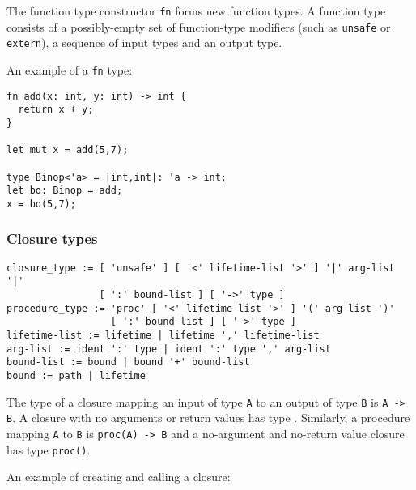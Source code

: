 \documentclass[]{article}
\begin{document}

The function type constructor \texttt{fn} forms new function types. A
function type consists of a possibly-empty set of function-type
modifiers (such as \texttt{unsafe} or \texttt{extern}), a sequence of
input types and an output type.

An example of a \texttt{fn} type:

\begin{verbatim}
fn add(x: int, y: int) -> int {
  return x + y;
}

let mut x = add(5,7);

type Binop<'a> = |int,int|: 'a -> int;
let bo: Binop = add;
x = bo(5,7);
\end{verbatim}

\subsubsection{Closure types}\label{closure-types}

\begin{verbatim}
closure_type := [ 'unsafe' ] [ '<' lifetime-list '>' ] '|' arg-list '|'
                [ ':' bound-list ] [ '->' type ]
procedure_type := 'proc' [ '<' lifetime-list '>' ] '(' arg-list ')'
                  [ ':' bound-list ] [ '->' type ]
lifetime-list := lifetime | lifetime ',' lifetime-list
arg-list := ident ':' type | ident ':' type ',' arg-list
bound-list := bound | bound '+' bound-list
bound := path | lifetime
\end{verbatim}

The type of a closure mapping an input of type \texttt{A} to an output
of type \texttt{B} is \texttt{\textbar{}A\textbar{} -\textgreater{} B}.
A closure with no arguments or return values has type
\texttt{\textbar{}\textbar{}}. Similarly, a procedure mapping \texttt{A}
to \texttt{B} is \texttt{proc(A) -\textgreater{} B} and a no-argument
and no-return value closure has type \texttt{proc()}.

An example of creating and calling a closure:
\end{document}
